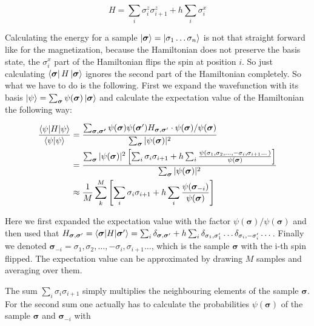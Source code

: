 \documentclass[submission, Phys]{SciPost}
\begin{document}
\begin{equation}
H = \sum_i \sigma^z_i \sigma^z_{i+1} + h \sum_i \sigma^x_{i}
\end{equation}

Calculating the energy for a sample $\ket{\bm{\sigma} }= \ket{\sigma_1 \dots  \sigma_n}$ is not that straight forward like for the magnetization, because the Hamiltonian does not preserve the basis state, the $\sigma^x_i$ part of the Hamiltonian flips the spin at position $i$. So just calculating $\bra{\bm{\sigma} } H \ket{\bm{\sigma} }$ ignores the second part of the Hamiltonian completely. So what we have to do is the following. First we expand the wavefunction with its basis $\ket{\psi} = \sum_{\bm{\sigma}} \psi(\bm{\sigma}) \ket{\bm{\sigma}} $ and calculate the expectation value of the Hamiltonian the following way:

\begin{align}
\frac{\braket{\psi | H | \psi}}{\braket{\psi | \psi}} &= \frac{\sum_{\bm{\sigma}, \bm{\sigma'}} \psi(\bm{\sigma}) \psi (\bm{\sigma}') H_{\bm{\sigma}, \bm{\sigma}'} \cdot \psi(\bm{\sigma}) / \psi(\bm{\sigma})}{ \sum_{\bm{\sigma}} | \psi(\bm{\sigma})|^2}  \\
&=  \frac{\sum_{\bm{\sigma}} | \psi({\bm{\sigma}}) |^2 \left[ \sum_i \sigma_i \sigma_{i+1} + h \sum_i \frac{\psi(\sigma_1, \sigma_2, \dots , -\sigma_i, \sigma_{i+1} \dots)}{\psi (\bm{\sigma})} \right]}{\sum_{\bm{\sigma}} | \psi({\bm{\sigma}} )|^2} \\
&\approx \frac{1}{M} \sum_k^M \left[ \sum_i \sigma_i \sigma_{i+1} + h \sum_i \frac{\psi (\bm{\sigma}_{-i})}{\psi (\bm{\sigma})} \right]
\end{align}

Here we first expanded the expectation value with the factor $\psi(\bm{\sigma}) / \psi(\bm{\sigma})$ and then used that $H_{\bm{\sigma}, \bm{\sigma}'}  = \braket{\bm{\sigma} | H | \bm{\sigma}'} = \sum_i \delta_{\bm{\sigma}, \bm{\sigma}'} + h \sum_i \delta_{\sigma_1, \sigma_1'} \dots \delta_{\sigma_i, -\sigma_i'} \dots$. Finally we denoted $\bm{\sigma}_{-i} = \sigma_1, \sigma_2, \dots , -\sigma_i, \sigma_{i+1} \dots$, which is the sample $\bm{\sigma}$ with the i-th spin flipped.
The expectation value can be approximated by drawing $M$ samples and averaging over them.

The sum $\sum_i \sigma_i \sigma_{i+1}$ simply multiplies the neighbouring elements of the sample $\bm{\sigma}$. For the second sum one actually has to calculate the probabilities $\psi (\bm{\sigma})$ of the sample $\bm{\sigma}$ and $\bm{\sigma}_{-i} $ with
\end{document}
